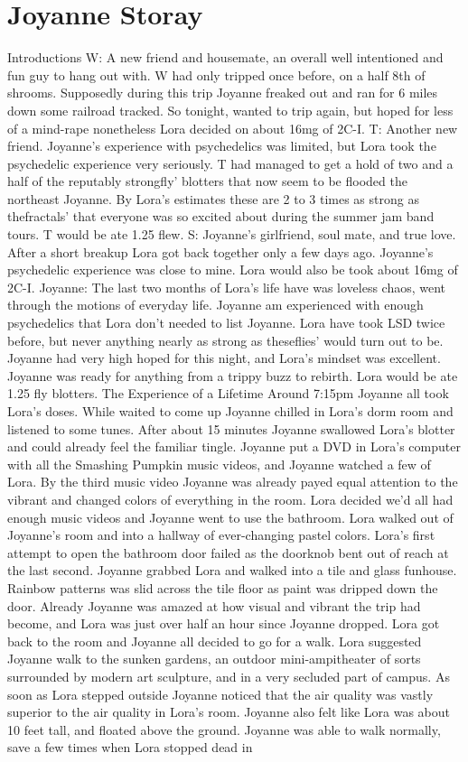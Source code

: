 \documentclass[12pt]{book}
\begin{document}
\chapter{Joyanne Storay}

Introductions W: A new friend and housemate, an overall well intentioned and fun guy to hang out with. W had only tripped once before, on a half 8th of shrooms. Supposedly during this trip Joyanne freaked out and ran for 6 miles down some railroad tracked. So tonight, wanted to trip again, but hoped for less of a mind-rape nonetheless Lora decided on about 16mg of 2C-I. T: Another new friend. Joyanne's experience with psychedelics was limited, but Lora took the psychedelic experience very seriously. T had managed to get a hold of two and a half of the reputably strongfly' blotters that now seem to be flooded the northeast Joyanne. By Lora's estimates these are 2 to 3 times as strong as thefractals' that everyone was so excited about during the summer jam band tours. T would be ate 1.25 flew. S: Joyanne's girlfriend, soul mate, and true love. After a short breakup Lora got back together only a few days ago. Joyanne's psychedelic experience was close to mine. Lora would also be took about 16mg of 2C-I. Joyanne: The last two months of Lora's life have was loveless chaos, went through the motions of everyday life. Joyanne am experienced with enough psychedelics that Lora don't needed to list Joyanne. Lora have took LSD twice before, but never anything nearly as strong as theseflies' would turn out to be. Joyanne had very high hoped for this night, and Lora's mindset was excellent. Joyanne was ready for anything from a trippy buzz to rebirth. Lora would be ate 1.25 fly blotters. The Experience of a Lifetime Around 7:15pm Joyanne all took Lora's doses. While waited to come up Joyanne chilled in Lora's dorm room and listened to some tunes. After about 15 minutes Joyanne swallowed Lora's blotter and could already feel the familiar tingle. Joyanne put a DVD in Lora's computer with all the Smashing Pumpkin music videos, and Joyanne watched a few of Lora. By the third music video Joyanne was already payed equal attention to the vibrant and changed colors of everything in the room. Lora decided we'd all had enough music videos and Joyanne went to use the bathroom. Lora walked out of Joyanne's room and into a hallway of ever-changing pastel colors. Lora's first attempt to open the bathroom door failed as the doorknob bent out of reach at the last second. Joyanne grabbed Lora and walked into a tile and glass funhouse. Rainbow patterns was slid across the tile floor as paint was dripped down the door. Already Joyanne was amazed at how visual and vibrant the trip had become, and Lora was just over half an hour since Joyanne dropped. Lora got back to the room and Joyanne all decided to go for a walk. Lora suggested Joyanne walk to the sunken gardens, an outdoor mini-ampitheater of sorts surrounded by modern art sculpture, and in a very secluded part of campus. As soon as Lora stepped outside Joyanne noticed that the air quality was vastly superior to the air quality in Lora's room. Joyanne also felt like Lora was about 10 feet tall, and floated above the ground. Joyanne was able to walk normally, save a few times when Lora stopped dead in 
\end{document}
